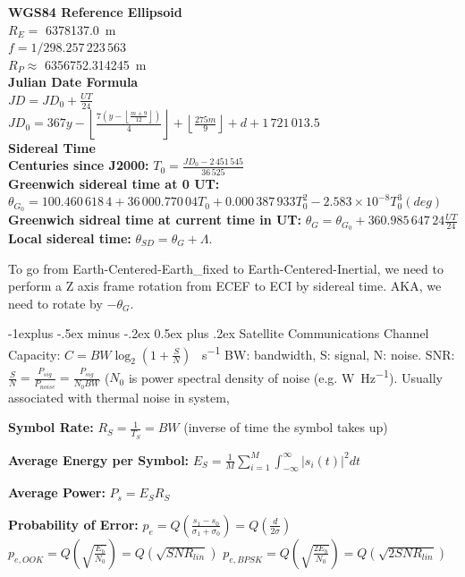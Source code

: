 \documentclass[letterpaper, 8pt]{extarticle}
\makeatletter
\renewcommand{\section}{\@startsection{section}{1}{0mm}%
                                {-1explus -.5ex minus -.2ex}%
                                {0.5ex plus .2ex}%
                                {\normalfont\small\bfseries}}
\makeatother
\begin{document}
\begin{multicols*}{5}
\textbf{WGS84 Reference Ellipsoid}\\
$R_E =$ \SI{6378137.0}{\metre}\\
$f = 1/298.257\,223\,563$ \\
$R_P \approx$ \SI{6356752.314245}{\metre}\\

\textbf{Julian Date Formula}\\
$JD = JD_0 + \frac{UT}{24}$\\
$JD_0 = 367y
- \left\lfloor\frac{7(y - \left\lfloor\frac{m + 9}{12}\right\rfloor)}{4}\right\rfloor
+ \left\lfloor\frac{275m}{9}\right\rfloor
+ d
+ 1\,721\,013.5$\\

\textbf{Sidereal Time}\\
\textbf{Centuries since J2000:}
$T_0 = \frac{JD_0 - 2\,451\,545}{36\,525}$\\
\textbf{Greenwich sidereal time at 0 UT:}
$\theta_{G_0} = 100.460\,618\,4
+ 36\,000.770\,04 T_0
+ 0.000\,387\,933 T_0^2
- 2.583 \times 10^{-8} T_0^3
(deg)$\\
\textbf{Greenwich sidreal time at current time in UT:}
$\theta_G = \theta_{G_0} + 360.985\,647\,24 \frac{UT}{24}$\\
\textbf{Local sidereal time:}
$\theta_{SD} = \theta_G + \Lambda$.

To go from Earth-Centered-Earth_fixed to Earth-Centered-Inertial,
we need to perform a Z axis frame rotation from ECEF to ECI by sidereal time.
AKA, we need to rotate by $-\theta_G$.

\section{Satellite Communications}
Channel Capacity:
$
C = BW \log_2 \left(1 + \frac{S}{N}\right)
$ \si{\bit\per\second}
BW: bandwidth, S: signal, N: noise.
SNR: $\frac{S}{N} = \frac{P_{sig}}{P_{noise}} = \frac{P_{sig}}{N_0 BW}$
($N_0$ is power spectral density of noise (e.g. \si{\watt\per\hertz}).
Usually associated with thermal noise in system,


\textbf{Symbol Rate:} $R_S = \frac{1}{T_S} = BW$ (inverse of time the symbol takes up)

\textbf{Average Energy per Symbol:} $E_S = \frac{1}{M} \sum_{i=1}^M \int_{-\infty}^{\infty}|s_i (t)|^2 dt$

\textbf{Average Power:} $P_s = E_S R_S$

\textbf{Probability of Error:} $p_e = Q\left(\frac{s_1 - s_0}{\sigma_1 + \sigma_0}\right) = Q\left(\frac{d}{2 \sigma}\right)$
$p_{e, OOK} = Q\left(\sqrt{\frac{E_b}{N_0}}\right) = Q(\sqrt{SNR_{lin}})$
$p_{e, BPSK} = Q\left(\sqrt{\frac{2 E_b}{N_0}}\right) = Q(\sqrt{2 SNR_{lin}})$


\end{multicols*}
\end{document}
